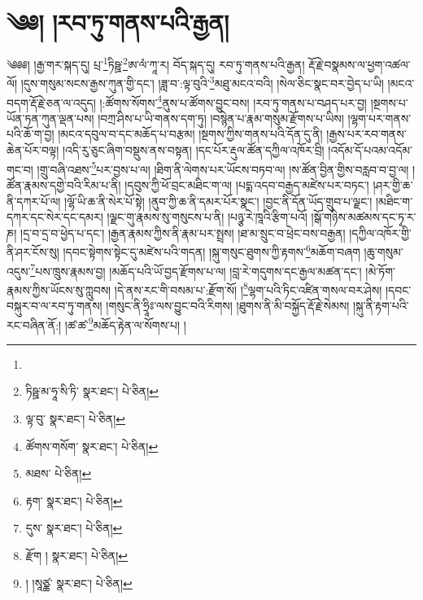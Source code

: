 \setcounter{footnote}{0} 
\chapter{༄༅། །རབ་ཏུ་གནས་པའི་རྒྱན།}༄༅༅། །རྒྱ་གར་སྐད་དུ། པྲ་\footnote{}ཏིཥྛ་\footnote{ཏིཥྛ་མ་ཧཱ་སི་ཏི་  སྣར་ཐང་།  པེ་ཅིན། }ཨ་ལཾ་ཀཱ་ར། བོད་སྐད་དུ། རབ་ཏུ་གནས་པའི་རྒྱན། རྡོ་རྗེ་བསྣམས་ལ་ཕྱག་འཚལ་ལོ། །དུས་གསུམ་སངས་རྒྱས་ཀུན་གྱི་དང་། །ཟླ་བ་:ལྟ་བུའི་\footnote{ལྟ་བུ་  སྣར་ཐང་།  པེ་ཅིན། }མཐུ་མངའ་བའི། །སེལ་ཅིང་སྣང་བར་བྱེད་པ་ཡི། །མངའ་བདག་རྡོ་རྗེ་ཅན་ལ་འདུད། །:ཚོགས་སོགས་\footnote{ཚོགས་གསོག་  སྣར་ཐང་།  པེ་ཅིན། }ནུས་པ་ཚོགས་བྱུང་བས། །རབ་ཏུ་གནས་པ་བཤད་པར་བྱ། །སྔགས་པ་ཡོན་ཏན་ཀུན་ལྡན་པས། །བཀྲ་ཤིས་པ་ཡི་གནས་དག་ཏུ། །བསྙེན་པ་རྣམ་གསུམ་རྫོགས་པ་ཡིས། །ལྷག་པར་གནས་པའི་ཆོ་ག་བྱ། །མངའ་དབུལ་བ་དང་མཆོད་པ་བརྩམ། །སྔགས་ཀྱིས་གནས་པའི་དོན་དུ་ནི། །རྒྱས་པར་རབ་གནས་ཆེན་པོར་བལྟ། །འདི་རུ་ཅུང་ཞིག་བསྡུས་ནས་བསྟན། །དང་པོར་རྡུལ་ཚོན་དཀྱིལ་འཁོར་བྲི། །འདོམ་དོ་པའམ་འདོམ་གང་བ། །གྲུ་བཞི་འཐས་\footnote{མཐས་  པེ་ཅིན། }པར་བྱས་པ་ལ། །ཐིག་ནི་ལེགས་པར་ཡོངས་བཏབ་ལ། །ས་ཚོན་བྱིན་གྱིས་བརླབ་བ་བྱ་ལ། །ཚོན་རྣམས་དགྱེ་བའི་རིམ་པ་ནི། །དབུས་ཀྱི་ཕོ་བྲང་མཐིང་ག་ལ། །པདྨ་འདབ་བརྒྱད་མཛེས་པར་བཏང་། །ཤར་གྱི་ཆ་ནི་དཀར་པོ་ལ། །ལྷོ་ཡི་ཆ་ནི་སེར་པོ་སྟེ། །ནུབ་ཀྱི་ཆ་ནི་དམར་པོར་སྣང་། །བྱང་ནི་དོན་ཡོད་གྲུབ་པ་ལྗང་། །མཐིང་ག་དཀར་དང་སེར་དང་དམར། །ལྗང་གུ་རྣམས་སུ་གསུངས་པ་ནི། །པཉྩ་རེ་ཁཱའི་རྩིག་པའོ། །སྒོ་གཉིས་མཚམས་དང་ཏྭ་ར་ཎ། །དྲ་བ་དྲ་བ་ཕྱེད་པ་དང་། །རྒྱན་རྣམས་ཀྱིས་ནི་རྣམ་པར་སྤྲས། །ཐ་མ་སྲུང་བ་ཕྲེང་བས་བརྒྱན། །དཀྱིལ་འཁོར་གྱི་ནི་ཤར་ངོས་སུ། །དབང་སྟེགས་སྟེང་དུ་མཛེས་པའི་གདན། །སྐུ་གསུང་ཐུགས་ཀྱི་རྟགས་\footnote{རྟག་  སྣར་ཐང་།  པེ་ཅིན། }མཆོག་བཞག །ཆུ་གསུམ་འདུས་\footnote{དུས་  སྣར་ཐང་།  པེ་ཅིན། }པས་ཁྲུས་རྣམས་བྱ། །མཆོད་པའི་ཡོ་བྱད་རྫོགས་པ་ལ། །བླ་རེ་གདུགས་དང་རྒྱལ་མཚན་དང་། །མེ་ཏོག་རྣམས་ཀྱིས་ཡོངས་སུ་ཀླུབས། །དེ་ནས་རང་གི་བསམ་པ་:རྫོག་སོ། །\footnote{རྫོག །  སྣར་ཐང་།  པེ་ཅིན། }ལྷག་པའི་ཏིང་འཛིན་གསལ་བར་ཤེས། །དབང་བསྐུར་བ་ལ་རབ་ཏུ་གནས། །གསུང་ནི་ཧྲཱིཿ་ལས་བྱུང་བའི་རིགས། །ཐུགས་ནི་མི་བསྐྱོད་རྡོ་རྗེ་སེམས། །སྐུ་ནི་རྟག་པའི་རང་བཞིན་ནོ:། །ཚ་ཚ་\footnote{། །སཱཙྪ་  སྣར་ཐང་།  པེ་ཅིན། }མཆོད་རྟེན་ལ་སོགས་པ། །
